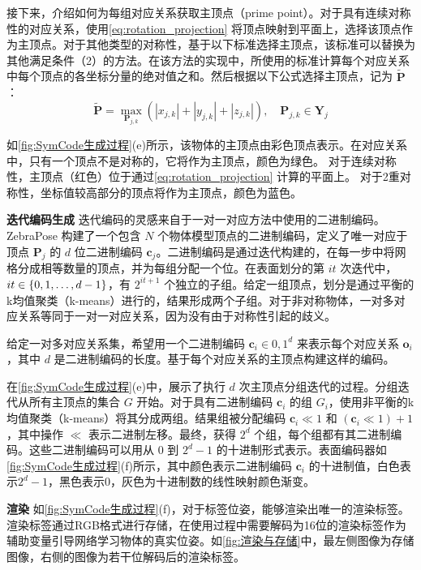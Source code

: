 接下来，介绍如何为每组对应关系获取主顶点（prime point）。对于具有连续对称性的对应关系，使用\autoref{eq:rotation_projection} 将顶点映射到平面上，选择该顶点作为主顶点。对于其他类型的对称性，基于以下标准选择主顶点，该标准可以替换为其他满足条件（2）的方法。在该方法的实现中，所使用的标准计算每个对应关系中每个顶点的各坐标分量的绝对值之和。然后根据以下公式选择主顶点，记为 $\tilde{\bm{P}}$：
\begin{equation}
    \tilde{\bm{P}} = \max_{\bm{P}_{j,k}}
    (\left | x_{j,k} \right | +\left | y_{j,k} \right | +\left | z_{j,k} \right |), \quad \bm{P}_{j,k} \in \bm{Y}_j
\end{equation}

如\autoref{fig:SymCode生成过程}(e)所示，该物体的主顶点由彩色顶点表示。在对应关系中，只有一个顶点不是对称的，它将作为主顶点，颜色为绿色。
对于连续对称性，主顶点（红色）位于通过\autoref{eq:rotation_projection} 计算的平面上。
对于2重对称性，坐标值较高部分的顶点将作为主顶点，颜色为蓝色。

\textbf{迭代编码生成 } 迭代编码的灵感来自于一对一对应方法中使用的二进制编码\cite{su2022zebrapose}。ZebraPose\cite{su2022zebrapose} 构建了一个包含 $N$ 个物体模型顶点的二进制编码，定义了唯一对应于顶点 $\bm{P}_j$ 的 $d$ 位二进制编码 $\bm{c}_{j}$。二进制编码是通过迭代构建的，在每一步中将网格分成相等数量的顶点，并为每组分配一个位。在表面划分的第 $it$ 次迭代中，$it \in \{0, 1, \text{\textellipsis}, d-1\}$，有 $2^{it+1}$ 个独立的子组。给定一组顶点，划分是通过平衡的 k均值聚类（k-means）进行的，结果形成两个子组。对于非对称物体，一对多对应关系等同于一对一对应关系，因为没有由于对称性引起的歧义。

给定一对多对应关系集，希望用一个二进制编码 $\bm{c}_i \in {0, 1}^d$ 来表示每个对应关系 $\bm{o}_i$，其中 $d$ 是二进制编码的长度。基于每个对应关系的主顶点构建这样的编码。

在\autoref{fig:SymCode生成过程}(e)中，展示了执行 $d$ 次主顶点分组迭代的过程。分组迭代从所有主顶点的集合 $G$ 开始。对于具有二进制编码 $\bm{c}_i$ 的组 $G_{i}$，使用非平衡的k均值聚类（k-means）将其分成两组。结果组被分配编码 $\bm{c}_i \ll 1$ 和 $(\bm{c}_i \ll 1) + 1$，其中操作 $\ll$ 表示二进制左移。最终，获得 $2^d$ 个组，每个组都有其二进制编码。这些二进制编码可以用从 $0$ 到 $2^d - 1$ 的十进制形式表示。表面编码器如\autoref{fig:SymCode生成过程}(f)所示，其中颜色表示二进制编码 $\bm{c}_i$ 的十进制值，白色表示$2^d - 1$，黑色表示$0$，灰色为十进制数的线性映射颜色渐变。

\textbf{渲染 } 如\autoref{fig:SymCode生成过程}(f)，对于标签位姿，能够渲染出唯一的渲染标签。渲染标签通过RGB格式进行存储，在使用过程中需要解码为16位的渲染标签作为辅助变量引导网络学习物体的真实位姿。如\autoref{fig:渲染与存储}中，最左侧图像为存储图像，右侧的图像为若干位解码后的渲染标签。

